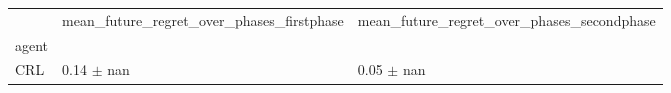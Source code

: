 \begin{tabular}{lll}
\toprule
 & mean_future_regret_over_phases_firstphase & mean_future_regret_over_phases_secondphase \\
agent &  &  \\
\midrule
CRL & 0.14 $\pm$ nan & 0.05 $\pm$ nan \\
\bottomrule
\end{tabular}
